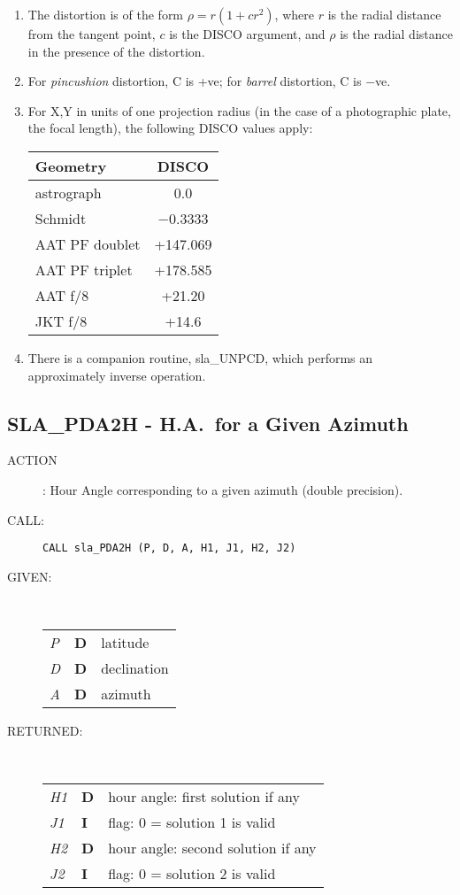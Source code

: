 \documentclass[11pt,twoside]{article}
\newcommand{\xlabel}[1]{}
\newcommand{\routine}[3]
{\hbadness=10000
  \vbox
  {
    \rule{\textwidth}{0.3mm}\\
    {\Large {\bf #1} \hfill #2 \hfill {\bf #1}}\\
    \setlength{\oldspacing}{\topsep}
    \setlength{\topsep}{0.3ex}
    \begin{description}
      #3
    \end{description}
    \setlength{\topsep}{\oldspacing}
  }
}
\renewcommand{\routine}[3]
   {
      \subsection{#1\xlabel{#1} - #2\label{#1}}
       \begin{description}
         #3
       \end{description}
   }
\newcommand{\action}[1]
{\item[ACTION]: #1}
\newcommand{\action}[1]
   {\item[ACTION:] #1}
\newcommand{\call}[1]
{\item[CALL]: \hspace{0.4em}{\tt #1}}
\newlength{\oldspacing}
\renewcommand{\call}[1]
   {
    \item[CALL:] {\tt #1}
   }
\newcommand{\args}[2]
{
  \goodbreak
  \setlength{\oldspacing}{\topsep}
  \setlength{\topsep}{0.3ex}
  \begin{description}
  \item[#1]:\\[1.5ex]
    \begin{tabular}{p{7em}p{6em}p{22em}}
      #2
    \end{tabular}
  \end{description}
  \setlength{\topsep}{\oldspacing}
}
\renewcommand{\args}[2]
   {
     \begin{description}
        \item[#1:]\\
        \begin{tabular}{p{7em}p{6em}l}
           #2
        \end{tabular}
     \end{description}
   }
\newcommand{\spec}[3]
{
  {\em {#1}} & {\bf \mbox{#2}} & {#3}
}
\begin{document}
{
 \begin{enumerate}
  \item The distortion is of the form $\rho = r (1 + c r^{2})$, where $r$ is
        the radial distance from the tangent point, $c$ is the DISCO
        argument, and $\rho$ is the radial distance in the presence of
        the distortion.
  \item For {\it pincushion}\/ distortion, C is +ve;  for
        {\it barrel}\/ distortion, C is $-$ve.
  \item For X,Y in units of one projection radius (in the case of
        a photographic plate, the focal length), the following
        DISCO values apply:

        \vspace{2ex}

        \hspace{5em}
        \begin{tabular}{|l|c|} \hline
         Geometry & DISCO \\ \hline \hline
         astrograph & 0.0 \\ \hline
         Schmidt & $-$0.3333 \\ \hline
         AAT PF doublet & +147.069 \\ \hline
         AAT PF triplet & +178.585 \\ \hline
         AAT f/8 & +21.20 \\ \hline
         JKT f/8 & +14.6 \\ \hline
        \end{tabular}

        \vspace{2ex}

  \item There is a companion routine, sla\_UNPCD, which performs
        an approximately inverse operation.
 \end{enumerate}
}
\routine{SLA\_PDA2H}{H.A.\ for a Given Azimuth}
{
 \action{Hour Angle corresponding to a given azimuth (double precision).}
 \call{CALL sla\_PDA2H (P, D, A, H1, J1, H2, J2)}
}
\args{GIVEN}
{
 \spec{P}{D}{latitude} \\
 \spec{D}{D}{declination} \\
 \spec{A}{D}{azimuth}
}
\args{RETURNED}
{
 \spec{H1}{D}{hour angle:  first solution if any} \\
 \spec{J1}{I}{flag: 0 = solution 1 is valid} \\
 \spec{H2}{D}{hour angle:  second solution if any} \\
 \spec{J2}{I}{flag: 0 = solution 2 is valid}
}
\end{document}
